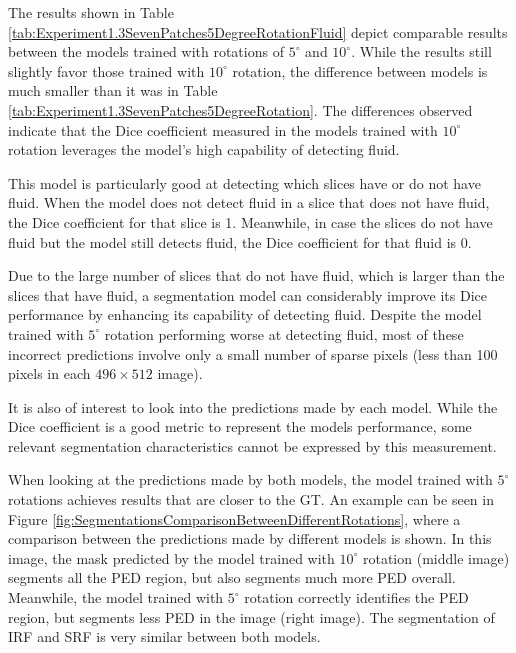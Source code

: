 The results shown in Table \ref{tab:Experiment1.3SevenPatches5DegreeRotationFluid} depict comparable results between the models trained with rotations of $5^{\circ}$ and $10^{\circ}$. While the results still slightly favor those trained with $10^{\circ}$ rotation, the difference between models is much smaller than it was in Table \ref{tab:Experiment1.3SevenPatches5DegreeRotation}. The differences observed indicate that the Dice coefficient measured in the models trained with $10^{\circ}$ rotation leverages the model's high capability of detecting fluid. 
\par
This model is particularly good at detecting which slices have or do not have fluid. When the model does not detect fluid in a slice that does not have fluid, the Dice coefficient for that slice is 1. Meanwhile, in case the slices do not have fluid but the model still detects fluid, the Dice coefficient for that fluid is 0.
\par
Due to the large number of slices that do not have fluid, which is larger than the slices that have fluid, a segmentation model can considerably improve its Dice performance by enhancing its capability of detecting fluid. Despite the model trained with $5^{\circ}$ rotation performing worse at detecting fluid, most of these incorrect predictions involve only a small number of sparse pixels (less than 100 pixels in each $496 \times 512$ image).
\par
It is also of interest to look into the predictions made by each model. While the Dice coefficient is a good metric to represent the models performance, some relevant segmentation characteristics cannot be expressed by this measurement.
\par
When looking at the predictions made by both models, the model trained with $5^{\circ}$ rotations achieves results that are closer to the GT. An example can be seen in Figure \ref{fig:SegmentationsComparisonBetweenDifferentRotations}, where a comparison between the predictions made by different models is shown. In this image, the mask predicted by the model trained with $10^{\circ}$ rotation (middle image) segments all the PED region, but also segments much more PED overall. Meanwhile, the model trained with $5^{\circ}$ rotation correctly identifies the PED region, but segments less PED in the image (right image). The segmentation of IRF and SRF is very similar between both models.

